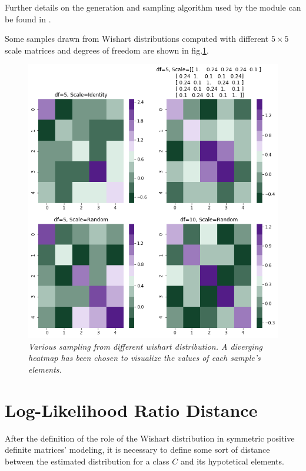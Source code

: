\documentclass[12pt,openright,twoside,a4paper]{book}
\begin{document}
Further details on the generation and sampling algorithm used  by the module can be found in \cite{WishGen}.

Some  samples drawn from Wishart distributions computed with different  $5 \times 5$ scale matrices and degrees of freedom are shown in fig.\ref{randmatr}.

\clearpage

\begin{figure}[!h]
\centering
\includegraphics[scale=0.5]{randmatr}
\caption{\textit{Various sampling from different wishart distribution. A diverging heatmap has been chosen to visualize the values of each sample's elements.}}
\label{randmatr}
\end{figure}

\section{Log-Likelihood Ratio Distance}

After the definition of the role of the Wishart distribution in symmetric positive definite matrices' modeling, it is necessary to define some sort of distance between the estimated distribution for a class $C$ and its hypotetical elements.
\end{document}
